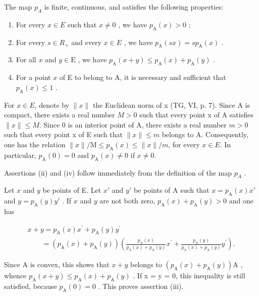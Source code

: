 The map \(p_{A}\) is finite, continuous, and satisfies the following properties:

\begin{enumerate}
\def\labelenumi{(\roman{enumi})}
\item
  For every \(x \in E\) such that \(x \neq 0\) , we have \(p_{\mathrm{A}}(x) > 0\) ;
\item
  For every \(s \in R_{+}\) and every \(x \in E\) , we have \(p_{\mathrm{A}}(sx) = sp_{\mathrm{A}}(x)\) .
\item
  For all \(x\) and \(y \in \mathrm{E}\) , we have \(p_{\mathrm{A}}(x + y) \leqslant p_{\mathrm{A}}(x) + p_{\mathrm{A}}(y)\) .
\item
  For a point \(x\) of E to belong to A, it is necessary and sufficient that \(p_{\mathrm{A}}(x) \leqslant 1\) .
\end{enumerate}

For \(x \in E\), denote by \(\|x\|\) the Euclidean norm of x (TG, VI, p. 7). Since A is compact, there exists a real number \(M > 0\) such that every point x of A satisfies \(\|x\| \leqslant M\). Since 0 is an interior point of A, there exists a real number \(m > 0\) such that every point x of E such that \(\|x\| \leqslant m\) belongs to A. Consequently, one has the relation \(\|x\|/\mathrm{M} \leqslant p_{\mathrm{A}}(x) \leqslant \|x\|/m\), for every \(x \in E\). In particular, \(p_{\mathrm{A}}(0) = 0\) and \(p_{\mathrm{A}}(x) \neq 0\) if \(x \neq 0\).

Assertions (ii) and (iv) follow immediately from the definition of the map \(p_{A}\) .

Let \(x\) and \(y\) be points of E. Let \(x'\) and \(y'\) be points of A such that \(x = p_{\mathrm{A}}(x)x'\) and \(y = p_{\mathrm{A}}(y)y'\) . If \(x\) and \(y\) are not both zero, \(p_{\mathrm{A}}(x) + p_{\mathrm{A}}(y) > 0\) and one has

\[
\begin{array}{l} x + y = p _ {\mathrm{A}} (x) x ^ {\prime} + p _ {\mathrm{A}} (y) y ^ {\prime} \\ \qquad = (p _ {\mathrm{A}} (x) + p _ {\mathrm{A}} (y)) \left(\frac {p _ {\mathrm{A}} (x)}{p _ {\mathrm{A}} (x) + p _ {\mathrm{A}} (y)} x ^ {\prime} + \frac {p _ {\mathrm{A}} (y)}{p _ {\mathrm{A}} (x) + p _ {\mathrm{A}} (y)} y ^ {\prime}\right). \end{array}
\]

Since A is convex, this shows that \(x + y\) belongs to \((p_{\mathrm{A}}(x) + p_{\mathrm{A}}(y))\mathrm{A}\) , whence \(p_{\mathrm{A}}(x + y) \leqslant p_{\mathrm{A}}(x) + p_{\mathrm{A}}(y)\) . If x = y = 0, this inequality is still satisfied, because \(p_{\mathrm{A}}(0) = 0\) . This proves assertion (iii).


